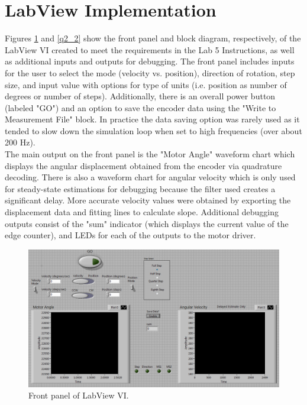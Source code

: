 \documentclass{article}
\theoremstyle{plain}
\theoremstyle{definition}
\theoremstyle{remark}
\begin{document}
\section{LabView Implementation}
Figures \ref{q2_1} and \ref{q2_2} show the front panel and block diagram, respectively, of the LabView VI created to meet the requirements in the Lab 5 Instructions, as well as additional inputs and outputs for debugging. The front panel includes inputs for the user to select the mode (velocity vs. position), direction of rotation, step size, and input value with options for type of units (i.e. position as number of degrees or number of steps). Additionally, there is an overall power button (labeled "GO") and an option to save the encoder data using the "Write to Measurement File" block. In practice the data saving option was rarely used as it tended to slow down the simulation loop when set to high frequencies (over about 200 Hz).\\

The main output on the front panel is the "Motor Angle" waveform chart which displays the angular displacement obtained from the encoder via quadrature decoding. There is also a waveform chart for angular velocity which is only used for steady-state estimations for debugging because the filter used creates a significant delay. More accurate velocity values were obtained by exporting the displacement data and fitting lines to calculate slope. Additional debugging outputs consist of the "sum" indicator (which displays the current value of the edge counter), and LEDs for each of the outputs to the motor driver.     \\


\begin{figure}[h]
\begin{center}
\includegraphics[width = 18cm]{VIFrontPanel.png}
\caption{Front panel of LabView VI.}
\label{q2_1}
\end{center}
\end{figure}
\end{document}
